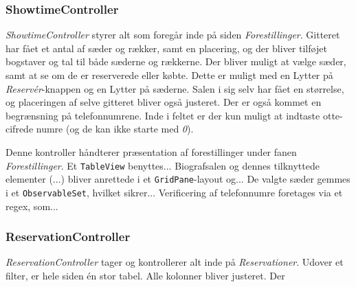\subsubsection{ShowtimeController}

\textit{ShowtimeController} styrer alt som foregår inde på siden \textit{Forestillinger}. Gitteret har fået et antal af sæder og rækker, samt en placering, og der bliver tilføjet bogstaver og tal til både sæderne og rækkerne. Der bliver muligt at vælge sæder, samt at se om de er reserverede eller købte. Dette er muligt med en Lytter på \textit{Reservér}-knappen og en Lytter på sæderne. Salen i sig selv har fået en størrelse, og placeringen af selve gitteret bliver også justeret. Der er også kommet en begrænsning på telefonnumrene. Inde i feltet er der kun muligt at indtaste otte-cifrede numre (og de kan ikke starte med \textit{0}).

Denne kontroller håndterer præsentation af forestillinger under fanen \textit{Forestillinger}. Et \texttt{TableView} benyttes... Biografsalen og dennes tilknyttede elementer (...) bliver anrettede i et \texttt{GridPane}-layout og... De valgte sæder gemmes i et \texttt{ObservableSet}, hvilket sikrer... Verificering af telefonnumre foretages via et regex, som... 
  
\subsubsection{ReservationController}

\textit{ReservationController} tager og kontrollerer alt inde på \textit{Reservationer}. Udover et filter, er hele siden én stor tabel. Alle kolonner bliver justeret. Der 